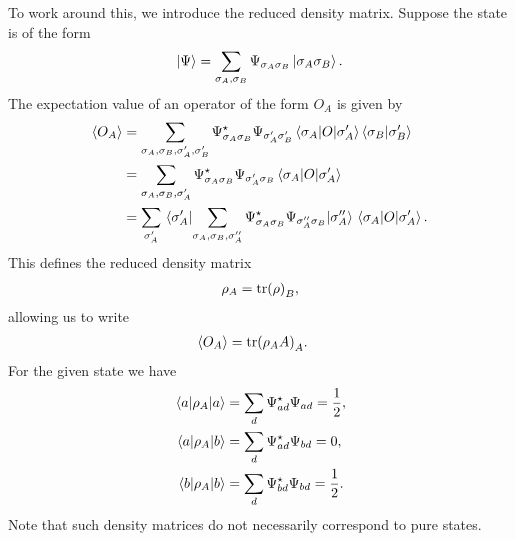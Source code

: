 To work around this, we introduce the reduced density matrix. Suppose the state is of the form
\begin{align*}
	\ket{\Psi} = \sum\limits_{\sigma_{A}, \sigma_{B}}\Psi_{\sigma_{A}\sigma_{B}}\ket{\sigma_{A}\sigma_{B}}.
\end{align*}
The expectation value of an operator of the form $O_{A}$ is given by
\begin{align*}
	\expval{O_{A}} &= \sum\limits_{\sigma_{A}, \sigma_{B}, \sigma_{A}^{\prime}, \sigma_{B}^{\prime}}\Psi^{\star}_{\sigma_{A}\sigma_{B}}\Psi_{\sigma_{A}^{\prime}\sigma_{B}^{\prime}}\mel{\sigma_{A}}{O}{\sigma_{A}^{\prime}}\braket{\sigma_{B}}{\sigma_{B}^{\prime}} \\
	               &= \sum\limits_{\sigma_{A}, \sigma_{B}, \sigma_{A}^{\prime}}\Psi^{\star}_{\sigma_{A}\sigma_{B}}\Psi_{\sigma_{A}^{\prime}\sigma_{B}}\mel{\sigma_{A}}{O}{\sigma_{A}^{\prime}} \\
	               &= \sum\limits_{\sigma_{A}^{\prime}}\mel{\sigma_{A}^{\prime}}{\sum\limits_{\sigma_{A},\sigma_{B}, \sigma_{A}^{\prime\prime}}\Psi^{\star}_{\sigma_{A}\sigma_{B}}\Psi_{\sigma_{A}^{\prime\prime}\sigma_{B}}}{\sigma_{A}^{\prime\prime}}\mel{\sigma_{A}}{O}{\sigma_{A}^{\prime}}.
\end{align*}
This defines the reduced density matrix
\begin{align*}
	\rho_{A} = \tr(\rho)_{B},
\end{align*}
allowing us to write
\begin{align*}
	\expval{O_{A}} &= \tr(\rho_{A}A)_{A}.
\end{align*}
For the given state we have
\begin{align*}
	\mel{a}{\rho_{A}}{a} &= \sum\limits_{d}\Psi^{\star}_{ad}\Psi_{ad} = \frac{1}{2}, \\
	\mel{a}{\rho_{A}}{b} &= \sum\limits_{d}\Psi^{\star}_{ad}\Psi_{bd} = 0, \\
	\mel{b}{\rho_{A}}{b} &= \sum\limits_{d}\Psi^{\star}_{bd}\Psi_{bd} = \frac{1}{2}.
\end{align*}
Note that such density matrices do not necessarily correspond to pure states.